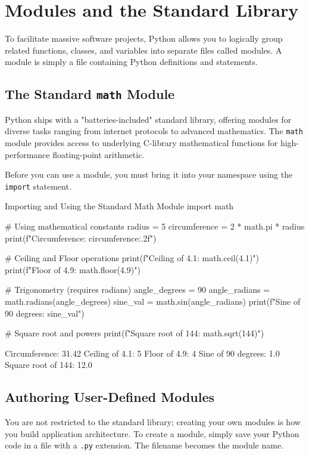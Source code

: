 \section{Modules and the Standard Library}

To facilitate massive software projects, Python allows you to logically group related functions, classes, and variables into separate files called modules. A module is simply a file containing Python definitions and statements.

\subsection{The Standard \texttt{math} Module}
Python ships with a "batteries-included" standard library, offering modules for diverse tasks ranging from internet protocols to advanced mathematics. The \texttt{math} module provides access to underlying C-library mathematical functions for high-performance floating-point arithmetic. 

Before you can use a module, you must bring it into your namespace using the \texttt{import} statement.

\begin{pythoncode}{Importing and Using the Standard Math Module}
import math

# Using mathematical constants
radius = 5
circumference = 2 * math.pi * radius
print(f"Circumference: {circumference:.2f}")

# Ceiling and Floor operations
print(f"Ceiling of 4.1: {math.ceil(4.1)}")
print(f"Floor of 4.9: {math.floor(4.9)}")

# Trigonometry (requires radians)
angle_degrees = 90
angle_radians = math.radians(angle_degrees)
sine_val = math.sin(angle_radians)
print(f"Sine of 90 degrees: {sine_val}")

# Square root and powers
print(f"Square root of 144: {math.sqrt(144)}")
\end{pythoncode}

\begin{outputbox}
Circumference: 31.42
Ceiling of 4.1: 5
Floor of 4.9: 4
Sine of 90 degrees: 1.0
Square root of 144: 12.0
\end{outputbox}

\subsection{Authoring User-Defined Modules}
You are not restricted to the standard library; creating your own modules is how you build application architecture. To create a module, simply save your Python code in a file with a \texttt{.py} extension. The filename becomes the module name.

